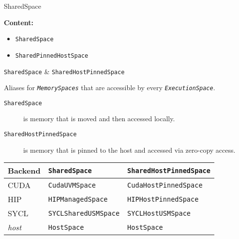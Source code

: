 
\begin{frame}[fragile]

  {\Huge SharedSpace}

  \vspace{10pt}

  \textbf{Content:}
  \begin{itemize}
    \item {\texttt{SharedSpace}}
    \item {\texttt{SharedPinnedHostSpace}}
  \end{itemize}

\end{frame}


\begin{frame}[fragile]{\texttt{SharedSpace} \& \texttt{SharedHostPinnedSpace}}

Aliases for \emph{\texttt{MemorySpaces}} that are accessible by every \emph{\texttt{ExecutionSpace}}.

\begin{description}
\item[\texttt{SharedSpace}] is memory that is moved and then accessed locally.
\item[\texttt{SharedHostPinnedSpace}] is memory that is pinned to the host and accessed via zero-copy access.
\end{description}

\begin{table}[htp]
\begin{center}
\begin{tabular}{| l | l | l |}
\hline
Backend & \texttt{SharedSpace} & \texttt{SharedHostPinnedSpace} \\
\hline \hline
CUDA & \texttt{CudaUVMSpace} & \texttt{CudaHostPinnedSpace} \\
\hline
HIP & \texttt{HIPManagedSpace} & \texttt{HIPHostPinnedSpace} \\
\hline
SYCL & \texttt{SYCLSharedUSMSpace} & \texttt{SYCLHostUSMSpace} \\
\hline
\emph{host} & \texttt{HostSpace} & \texttt{HostSpace} \\
\hline
\end{tabular}
\end{center}
\label{default}
\end{table}%



\end{frame}

